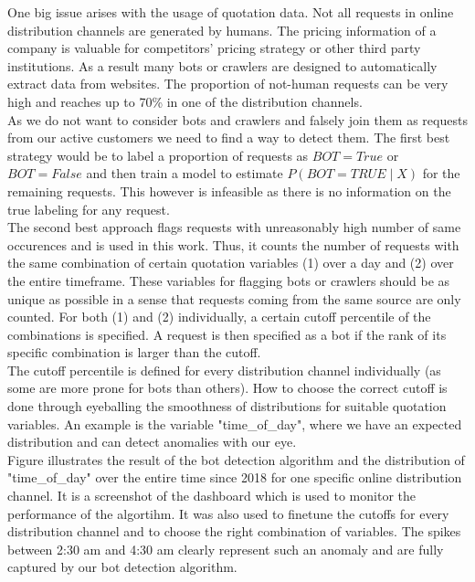 \documentclass[12pt,titlepage]{article}
\begin{document}
One big issue arises with the usage of quotation data. Not all requests in online distribution channels are generated by humans. The pricing information of a company is valuable for competitors' pricing strategy or other third party institutions. As a result many bots or crawlers are designed to automatically extract data from websites. The proportion of not-human requests can be very high and reaches up to 70\% in one of the distribution channels. \\
As we do not want to consider bots and crawlers and falsely join them as requests from our active customers we need to find a way to detect them. The first best strategy would be to label a proportion of requests as $BOT=True$ or $BOT=False$ and then train a model to estimate $P(BOT=TRUE \mid X)$ for the remaining requests. This however is infeasible as there is no information on the true labeling for any request. \\
The second best approach flags requests with unreasonably high number of same occurences and is used in this work. Thus, it counts the number of requests with the same combination of certain quotation variables (1) over a day and (2) over the entire timeframe. These variables for flagging bots or crawlers should be as unique as possible in a sense that requests coming from the same source are only counted. For both (1) and (2) individually, a certain cutoff percentile of the combinations is specified. A request is then specified as a bot if the rank of its specific combination is larger than the cutoff. \\
The cutoff percentile is defined for every distribution channel individually (as some are more prone for bots than others). How to choose the correct cutoff is done through eyeballing the smoothness of distributions for suitable quotation variables. An example is the variable "time\_of\_day", where we have an expected distribution and can detect anomalies with our eye. \\
Figure \label{fig:bots} illustrates the result of the bot detection algorithm and the distribution of "time\_of\_day" over the entire time since 2018 for one specific online distribution channel. It is a screenshot of the dashboard which is used to monitor the performance of the algortihm. It was also used to finetune the cutoffs for every distribution channel and to choose the right combination of variables. The spikes between 2:30 am and 4:30 am clearly represent such an anomaly and are fully captured by our bot detection algorithm. \\
\end{document}
